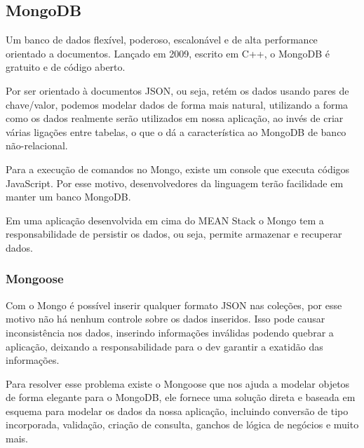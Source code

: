 \documentclass[
	12pt,				%
	openright,			%
	twoside,			%
	a4paper,			%
	english,			%
	brazil				%
	]{abntex2}
\begin{document}
\subsection{MongoDB}

Um banco de dados flexível, poderoso, escalonável e de alta performance orientado a documentos. Lançado em 2009, escrito em C++, o MongoDB é gratuito e de código aberto.

Por ser orientado à documentos JSON, ou seja, retém os dados usando pares de chave/valor, podemos modelar dados de forma mais natural, utilizando a forma como os dados realmente serão utilizados em nossa aplicação, ao invés de criar várias ligações entre tabelas, o que o dá a característica ao MongoDB de banco não-relacional.

Para a execução de comandos no Mongo, existe um console que executa códigos JavaScript. Por esse motivo, desenvolvedores da linguagem terão facilidade em manter um banco MongoDB.

Em uma aplicação desenvolvida em cima do MEAN Stack o Mongo tem a responsabilidade de persistir os dados, ou seja, permite armazenar e recuperar dados.



\subsubsection{Mongoose}

Com o Mongo é possível inserir qualquer formato JSON nas coleções, por esse motivo não há nenhum controle sobre os dados inseridos. Isso pode causar inconsistência nos dados, inserindo informações inválidas podendo quebrar a aplicação, deixando a responsabilidade para o dev garantir a exatidão das informações.

Para resolver esse problema existe o Mongoose que nos ajuda a modelar objetos de forma elegante para o MongoDB, ele fornece uma solução direta e baseada em esquema para modelar os dados da nossa aplicação, incluindo conversão de tipo incorporada, validação, criação de consulta, ganchos de lógica de negócios e muito mais.
\end{document}
